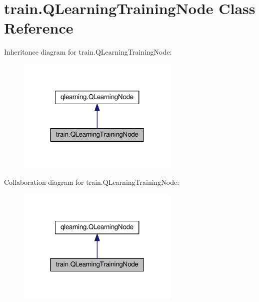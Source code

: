 \hypertarget{classtrain_1_1_q_learning_training_node}{}\section{train.\+Q\+Learning\+Training\+Node Class Reference}
\label{classtrain_1_1_q_learning_training_node}


Inheritance diagram for train.\+Q\+Learning\+Training\+Node\+:
\nopagebreak
\begin{figure}[H]
\begin{center}
\leavevmode
\includegraphics[width=220pt]{classtrain_1_1_q_learning_training_node__inherit__graph}
\end{center}
\end{figure}


Collaboration diagram for train.\+Q\+Learning\+Training\+Node\+:
\nopagebreak
\begin{figure}[H]
\begin{center}
\leavevmode
\includegraphics[width=220pt]{classtrain_1_1_q_learning_training_node__coll__graph}
\end{center}
\end{figure}
